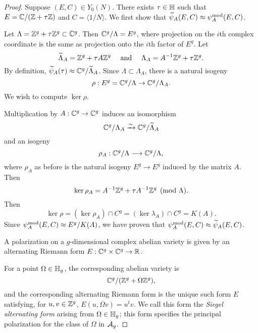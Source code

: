 \documentclass{amsart}
\begin{document}
\begin{proof}
  Suppose $(E, C) \in Y_0(N)$. There exists $\tau \in \mathbb{H}$ such that $E = \mathbb{C}/(\mathbb{Z} + \tau \mathbb{Z})$ and $C = \langle 1/N \rangle$. We first show that $\widetilde{\psi}_{A}(E,C) \approx \psi_{A}^\mathrm{mod}(E,C)$.

  Let $\Lambda = \mathbb{Z}^g + \tau \mathbb{Z}^g \subset \mathbb{C}^g$. Then $\mathbb{C}^g/\Lambda = E^g$, where projection on the $i$th complex coordinate is the same as projection onto the $i$th factor of $E^g$. Let
  \[
    \widetilde{\Lambda}_A = \mathbb{Z}^g + \tau A \mathbb{Z}^g \quad \text{ and } \quad     \Lambda_A = A^{-1}\mathbb{Z}^g + \tau \mathbb{Z}^g.
  \]
By definition, $\widetilde{\psi}_{A}(\tau) \approx \mathbb{C}^g/\widetilde{\Lambda}_A$.
 Since $\Lambda \subset \Lambda_A$, there is a natural isogeny
  \[
    \rho: E^g = \mathbb{C}^g/\Lambda \to \mathbb{C}^g/\Lambda_A.
  \]
  We wish to compute $\ker \rho$.

  Multiplication by $A: \mathbb{C}^g \to \mathbb{C}^g$ induces an isomorphism
  \[
     \mathbb{C}^g/\Lambda_A \xrightarrow{\sim}  \mathbb{C}^g/\widetilde{\Lambda}_A
  \]
and an isogeny
  \[
    \rho_A: \mathbb{C}^g/\Lambda \longrightarrow \mathbb{C}^g/\Lambda,
  \]
  where $\rho_A$ as before is the natural isogeny $E^g \to E^g$ induced by the matrix $A$. Then
\[
\ker \rho_A = A^{-1}\mathbb{Z}^g + \tau A^{-1} \mathbb{Z}^g \pmod{\Lambda}.
\]
Then
\[
\ker \rho = (\ker \rho_A) \cap C^g = (\ker \lambda_A) \cap C^g = K(A).
\]
Since $\psi_{A}^\mathrm{mod}(E,C) \approx E^g/K(A)$, we have proven that $\psi_{A}^\mathrm{mod}(E,C) \approx \widetilde{\psi}_{A}(E,C)$.

  A polarization on a $g$-dimensional complex abelian variety is given by an alternating Riemann form $E: \mathbb{C}^g \times \mathbb{C}^g \to \mathbb{R}$.

  For a point $\Omega \in \mathbb{H}_g$, the corresponding abelian variety is
\[
\mathbb{C}^g/(\mathbb{Z}^g + \Omega \mathbb{Z}^g),
\]
and the corresponding alternating Riemann form is the unique such form $E$ satisfying, for $u,v \in \mathbb{Z}^g$, $E(u,\Omega v) = u^tv$. We call this form the \emph{Siegel alternating form} arising from $\Omega \in \mathbb{H}_g$; this form specifies the principal polarization for the class of $\Omega$ in $\mathcal{A}_g$. %


\end{proof}
\end{document}
